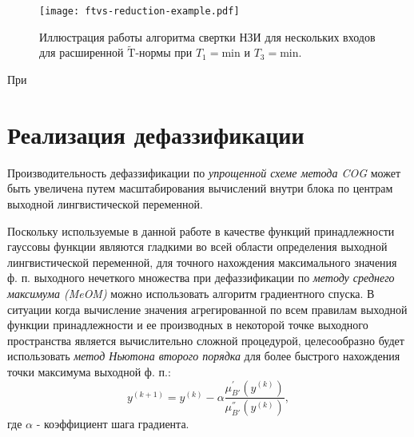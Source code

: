 \begin{figure}
    \label{fig:ftvs-reduction-example}
    \centering
    \texttt{[image: ftvs-reduction-example.pdf]}
    \caption{Иллюстрация работы алгоритма свертки НЗИ для нескольких входов для расширенной $\mathrm{\tilde{T}}$-нормы при $T_1=\mathrm{min}$ и $T_3=\mathrm{min}$.}
\end{figure}

При 



\section{Реализация дефаззификации}

Производительность дефаззификации по \textit{упрощенной схеме метода COG} может быть увеличена путем масштабирования вычислений внутри блока по центрам выходной лингвистической переменной.

Поскольку используемые в данной работе в качестве функций принадлежности гауссовы функции являются гладкими во всей области определения выходной лингвистической переменной, для точного нахождения максимального значения ф. п. выходного нечеткого множества при дефаззификации по \textit{методу среднего максимума (MeOM)} можно использовать алгоритм градиентного спуска. В ситуации когда вычисление значения агрегированной по всем правилам выходной функции принадлежности и ее производных в некоторой точке выходного пространства является вычислительно сложной процедурой, целесообразно будет использовать \textit{метод Ньютона второго порядка} для более быстрого нахождения точки максимума выходной ф. п.:
\begin{equation}
	y^{(k+1)} = y^{(k)} - \alpha \frac{\mu_{B'}^{'}(y^{(k)})}{\mu_{B'}^{''}(y^{(k)})},
	\label{eqn:defuz-impl-meom-1}
\end{equation}
где $\alpha $ - коэффициент шага градиента.

